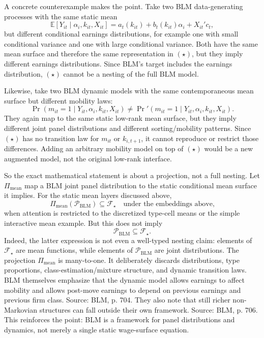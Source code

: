 ﻿\documentclass[11pt]{article}
\newcommand{\E}{\mathbb{E}}
\newcommand{\1}{\mathbf{1}}
\begin{document}
A concrete counterexample makes the point. Take two BLM data-generating processes
with the same static mean
\[
\E[Y_{it}\mid \alpha_i,k_{it},X_{it}]
=
a_t(k_{it})+b_t(k_{it})\alpha_i+X_{it}'c_t,
\]
but different conditional earnings distributions, for example one with small
conditional variance and one with large conditional variance. Both have the same
mean surface and therefore the same representation in $(\star)$, but they imply
different earnings distributions. Since BLM's target includes the earnings
distribution, $(\star)$ cannot be a nesting of the full BLM model.

Likewise, take two BLM dynamic models with the same contemporaneous mean surface
but different mobility laws:
\[
\Pr(m_{it}=1\mid Y_{it},\alpha_i,k_{it},X_{it})
\neq
\Pr'(m_{it}=1\mid Y_{it},\alpha_i,k_{it},X_{it}).
\]
They again map to the same static low-rank mean surface, but they imply different
joint panel distributions and different sorting/mobility patterns. Since
$(\star)$ has no transition law for $m_{it}$ or $k_{i,t+1}$, it cannot reproduce
or restrict those differences. Adding an arbitrary mobility model on top of
$(\star)$ would be a new augmented model, not the original low-rank interface.

So the exact mathematical statement is about a projection, not a full nesting.
Let $\Pi_{\mathrm{mean}}$ map a BLM joint panel distribution to the static
conditional mean surface it implies. For the static mean layers discussed above,
\[
\Pi_{\mathrm{mean}}\left(\mathcal P_{\mathrm{BLM}}\right)
\subseteq \mathcal F_\star
\quad\text{under the embeddings above,}
\]
when attention is restricted to the discretized type-cell means or the simple
interactive mean example. But this does not imply
\[
\mathcal P_{\mathrm{BLM}}\subseteq \mathcal F_\star.
\]
Indeed, the latter expression is not even a well-typed nesting claim: elements
of $\mathcal F_\star$ are mean functions, while elements of
$\mathcal P_{\mathrm{BLM}}$ are joint distributions. The projection
$\Pi_{\mathrm{mean}}$ is many-to-one. It deliberately discards distributions,
type proportions, class-estimation/mixture structure, and dynamic transition
laws. BLM themselves emphasize that the dynamic model allows earnings to affect
mobility and allows post-move earnings to depend on previous earnings and
previous firm class. Source: BLM, p. 704. They also note that still richer
non-Markovian structures can fall outside their own framework. Source: BLM,
p. 706. This reinforces the point: BLM is a framework for panel distributions
and dynamics, not merely a single static wage-surface equation.
\end{document}
